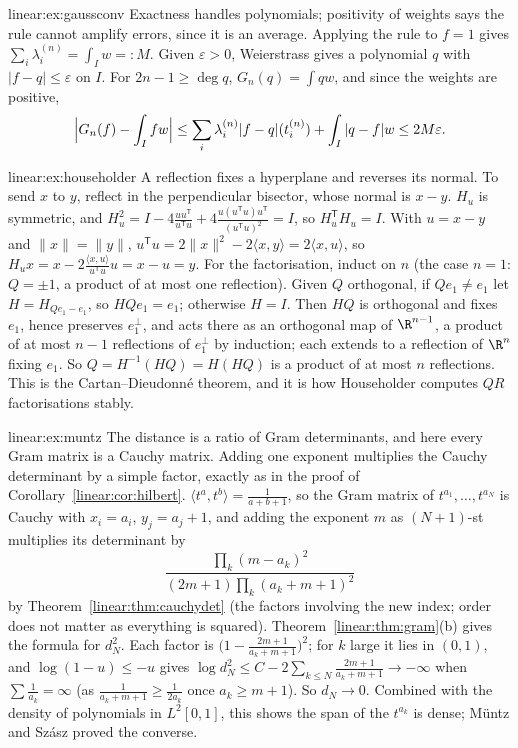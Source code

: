 \begin{solution}{linear:ex:gaussconv}
\idea Exactness handles polynomials; positivity of weights says the rule cannot amplify errors, since it is an average.
\writeup Applying the rule to $f=1$ gives $\sum_i\lambda_i^{(n)}=\int_Iw=:M$. Given $\varepsilon>0$, Weierstrass gives a
polynomial $q$ with $|f-q|\le\varepsilon$ on $I$. For $2n-1\ge\deg q$, $G_n(q)=\int qw$, and since the weights are
positive,
\[
\Bigl|G_n(f)-\int_Ifw\Bigr|\le\sum_i\lambda_i^{(n)}|f-q|(t_i^{(n)})+\int_I|q-f|w\le2M\varepsilon.
\]
\end{solution}

\begin{solution}{linear:ex:householder}
\idea A reflection fixes a hyperplane and reverses its normal. To send $x$ to $y$, reflect in the perpendicular bisector,
whose normal is $x-y$.
\writeup $H_u$ is symmetric, and $H_u^2=I-4\frac{uu^{\mathsf T}}{u^{\mathsf T}u}+4\frac{u(u^{\mathsf T}u)u^{\mathsf T}}{(u^{\mathsf T}u)^2}=I$,
so $H_u^{\mathsf T}H_u=I$. With $u=x-y$ and $\|x\|=\|y\|$, $u^{\mathsf T}u=2\|x\|^2-2\langle x,y\rangle=2\langle x,u\rangle$, so
$H_ux=x-2\frac{\langle x,u\rangle}{u^{\mathsf T}u}u=x-u=y$. For the factorisation, induct on $n$ (the case $n=1$: $Q=\pm1$,
a product of at most one reflection). Given $Q$ orthogonal, if $Qe_1\ne e_1$ let $H=H_{Qe_1-e_1}$, so $HQe_1=e_1$;
otherwise $H=I$. Then $HQ$ is orthogonal and fixes $e_1$, hence preserves $e_1^\perp$, and acts there as an orthogonal
map of $\R^{n-1}$, a product of at most $n-1$ reflections of $e_1^\perp$ by induction; each extends to a reflection of
$\R^n$ fixing $e_1$. So $Q=H^{-1}(HQ)=H(HQ)$ is a product of at most $n$ reflections. This is the Cartan--Dieudonn\'e
theorem, and it is how Householder computes $QR$ factorisations stably.
\end{solution}

\begin{solution}{linear:ex:muntz}
\idea The distance is a ratio of Gram determinants, and here every Gram matrix is a Cauchy matrix. Adding one exponent
multiplies the Cauchy determinant by a simple factor, exactly as in the proof of Corollary~\ref{linear:cor:hilbert}.
\writeup $\langle t^a,t^b\rangle=\frac1{a+b+1}$, so the Gram matrix of $t^{a_1},\dots,t^{a_N}$ is Cauchy with $x_i=a_i$,
$y_j=a_j+1$, and adding the exponent $m$ as $(N+1)$-st multiplies its determinant by
\[
\frac{\prod_k(m-a_k)^2}{(2m+1)\prod_k(a_k+m+1)^2}
\]
by Theorem~\ref{linear:thm:cauchydet} (the factors involving the new index; order does not matter as everything is squared).
Theorem~\ref{linear:thm:gram}(b) gives the formula for $d_N^2$. Each factor is $\bigl(1-\frac{2m+1}{a_k+m+1}\bigr)^2$; for $k$
large it lies in $(0,1)$, and $\log(1-u)\le-u$ gives $\log d_N^2\le C-2\sum_{k\le N}\frac{2m+1}{a_k+m+1}\to-\infty$ when
$\sum\frac1{a_k}=\infty$ (as $\frac1{a_k+m+1}\ge\frac1{2a_k}$ once $a_k\ge m+1$). So $d_N\to0$. Combined with the density
of polynomials in $L^2[0,1]$, this shows the span of the $t^{a_k}$ is dense; M\"untz and Sz\'asz proved the converse.
\end{solution}

